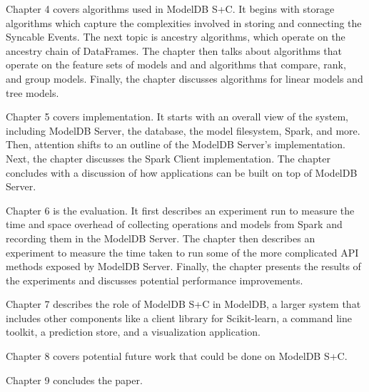 Chapter 4 covers algorithms used in ModelDB S+C. It 
begins with storage algorithms which capture the complexities involved in storing
and connecting the Syncable Events. The next topic is ancestry algorithms, which
operate on the ancestry chain of DataFrames. The chapter then talks about algorithms
that operate on the feature sets of models and and algorithms that compare, rank,
and group models. Finally, the chapter discusses algorithms for linear models
and tree models.

Chapter 5 covers implementation. It starts with an overall view of the system,
including ModelDB Server, the database, the model filesystem, Spark, and more. 
Then, attention shifts to an outline of the ModelDB Server's implementation. Next,
the chapter discusses the Spark Client implementation. The chapter concludes with
a discussion of how applications can be built on top of ModelDB Server.

Chapter 6 is the evaluation. It first describes an experiment run to measure the
time and space overhead of collecting operations and models from Spark and recording
them in the ModelDB Server. The chapter then describes an experiment to measure
the time taken to run some of the more complicated API methods exposed by ModelDB Server.
Finally, the chapter presents the results of the experiments and discusses potential performance
improvements.

Chapter 7 describes the role of ModelDB S+C in ModelDB,
a larger system that includes other components like a client library for Scikit-learn,
a command line toolkit, a prediction store, and a visualization application.

Chapter 8 covers potential future work that could be done on ModelDB S+C.

Chapter 9 concludes the paper.
